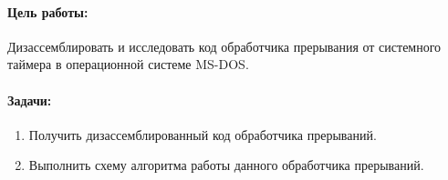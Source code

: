 \Introduction

\paragraph{Цель работы:} Дизассемблировать и исследовать код обработчика прерывания от системного таймера в операционной системе MS-DOS.

\paragraph{Задачи:}
\begin{enumerate}
	\item Получить дизассемблированный код обработчика прерываний.
	\item Выполнить схему алгоритма работы данного обработчика прерываний.
\end{enumerate}

\newpage
